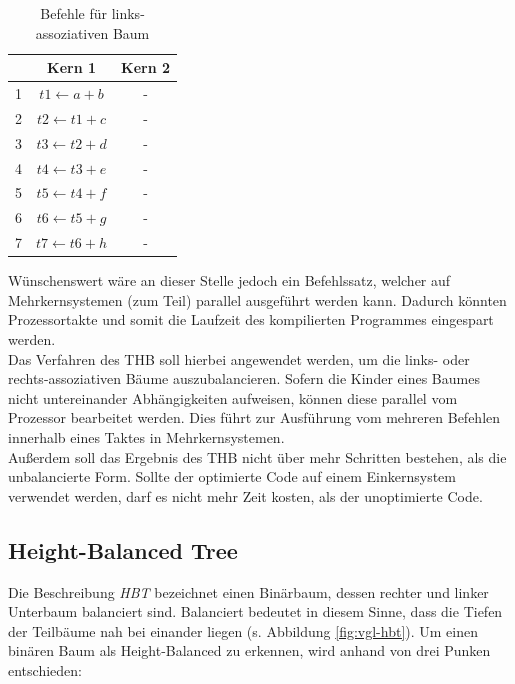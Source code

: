 \begin{table}
	\begin{center}
		\begin{tabular}{|c|c|c|}
			\hline  & Kern 1 & Kern 2 \\ 
			\hline 1 & $ t1 \leftarrow a + b $& - \\ 
			\hline 2 & $ t2 \leftarrow t1 + c $& - \\ 
			\hline 3 & $ t3 \leftarrow t2 + d $& - \\ 
			\hline 4 & $ t4 \leftarrow t3 + e $& - \\ 
			\hline 5 & $ t5 \leftarrow t4 + f $& - \\ 
			\hline 6 & $ t6 \leftarrow t5 + g $& - \\ 
			\hline 7 & $ t7 \leftarrow t6 + h $& - \\ 
			\hline 
		\end{tabular}
	\end{center}
	\caption{Befehle für links-assoziativen Baum}
	\label{tab:links-assoziativer-baum}
\end{table}


Wünschenswert wäre an dieser Stelle jedoch ein Befehlssatz, welcher auf Mehrkernsystemen (zum Teil) parallel ausgeführt werden kann. Dadurch könnten Prozessortakte und somit die Laufzeit des kompilierten Programmes eingespart werden.\\
Das Verfahren des THB soll hierbei angewendet werden, um die links- oder rechts-assoziativen Bäume auszubalancieren. Sofern die Kinder eines Baumes nicht untereinander Abhängigkeiten aufweisen, können diese parallel vom Prozessor bearbeitet werden. Dies führt zur Ausführung vom mehreren Befehlen innerhalb eines Taktes in Mehrkernsystemen.\\
Außerdem soll das Ergebnis des THB nicht über mehr Schritten bestehen, als die unbalancierte Form. Sollte der optimierte Code auf einem Einkernsystem verwendet werden, darf es nicht mehr Zeit kosten, als der unoptimierte Code.


\subsection{Height-Balanced Tree}
Die Beschreibung \textit{\ac{HBT}} bezeichnet einen Binärbaum, dessen rechter und linker Unterbaum balanciert sind. Balanciert bedeutet in diesem Sinne, dass die Tiefen der Teilbäume nah bei einander liegen (s. Abbildung \ref{fig:vgl-hbt}\cite{geeks}).\cite{hbt}
Um einen binären Baum als Height-Balanced zu erkennen, wird anhand von drei Punken entschieden:

